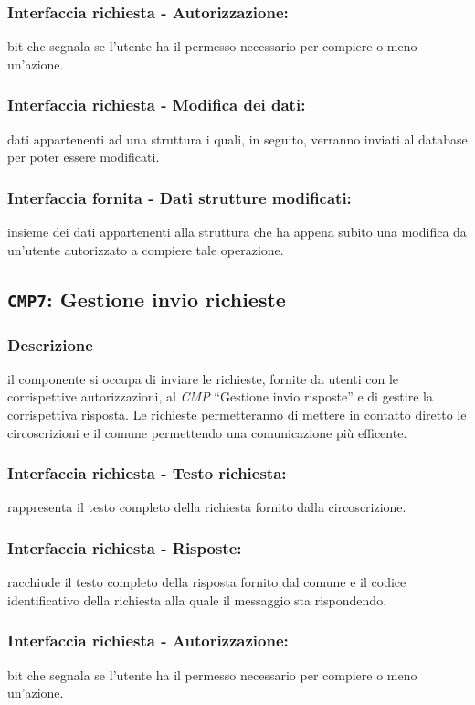         \subsubsection{Interfaccia richiesta - Autorizzazione:}
            bit che segnala se l'utente ha il permesso necessario per compiere o meno un'azione.
        \subsubsection{Interfaccia richiesta - Modifica dei dati:}
            dati appartenenti ad una struttura i quali, in seguito, verranno inviati al database per poter essere modificati.
        \subsubsection{Interfaccia fornita - Dati strutture modificati:}
            insieme dei dati appartenenti alla struttura che ha appena subito una modifica da un'utente autorizzato a compiere tale operazione.

    \subsection{\texttt{CMP7}: Gestione invio richieste}
        \subsubsection{Descrizione}
            il componente si occupa di inviare le richieste, fornite da utenti con le corrispettive autorizzazioni, al \textit{CMP} ``Gestione invio risposte'' e di gestire la corrispettiva risposta. Le richieste permetteranno di mettere in contatto diretto le circoscrizioni e il comune permettendo una comunicazione più efficente.
        \subsubsection{Interfaccia richiesta - Testo richiesta:}
            rappresenta il testo completo della richiesta fornito dalla circoscrizione.
        \subsubsection{Interfaccia richiesta - Risposte:}
            racchiude il testo completo della risposta fornito dal comune e il codice identificativo della richiesta alla quale il messaggio sta rispondendo.
        \subsubsection{Interfaccia richiesta - Autorizzazione:}
            bit che segnala se l'utente ha il permesso necessario per compiere o meno un'azione.
